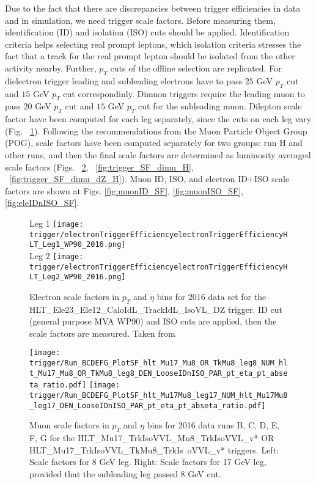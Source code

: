 Due to the fact that there are discrepancies between trigger efficiencies in data and in simulation, we need trigger scale factors. Before measuring them, identification (ID) and isolation (ISO) cuts should be applied. Identification criteria helps selecting real prompt leptons, which isolation criteria stresses the fact that a track for the real prompt lepton should be isolated from the other activity nearby. Further, $p_{T}$ cuts of the offline selection are replicated. For dielectron trigger leading and subleading electrons have to pass $25$ GeV $p_{T}$ cut and $15$ GeV $p_{T}$ cut correspondinly. Dimuon triggers require the leading muon to pass $20$ GeV $p_{T}$ cut and $15$ GeV $p_{T}$ cut for the subleading muon. 
Dilepton scale factor have been computed for each leg separately, since the cuts on each leg vary (Fig. ~\ref{fig:trigger_eff_diele}). Following the recommendations from the Muon Particle Object Group (POG), scale factors have been computed separately for two groups: run H and other runs, and then the final scale factors are determined as luminosity averaged scale factors (Figs. ~\ref{fig:trigger_SF_dimu_BCDEFG}, ~\ref{fig:trigger_SF_dimu_H}, ~\ref{fig:trigger_SF_dimu_dZ_H}). Muon ID, ISO, and electron ID$+$ISO scale factors are shown at Figs. \ref{fig:muonID_SF}, \ref{fig:muonISO_SF}, \ref{fig:eleIDnISO_SF}.


\begin{figure}
\centering
\subfloat Leg 1
{\texttt{[image: trigger/electronTriggerEfficiencyelectronTriggerEfficiencyHLT\_Leg1\_WP90\_2016.png]} } \\
\subfloat Leg 2
{\texttt{[image: trigger/electronTriggerEfficiencyelectronTriggerEfficiencyHLT\_Leg2\_WP90\_2016.png]} } \\
\caption{Electron scale factors in $p_{T}$ and $\eta$ bins for 2016 data set for the HLT\_Ele23\_Ele12\_CaloIdL\_TrackIdL\_IsoVL\_DZ trigger. ID cut (general purpose MVA WP90) and ISO cuts are applied, then the scale factors are measured. Taken from ~\cite{vhbbAN}}
\label{fig:trigger_eff_diele}
\end{figure}


\begin{figure}
\centering
\texttt{[image: trigger/Run\_BCDEFG\_PlotSF\_hlt\_Mu17\_Mu8\_OR\_TkMu8\_leg8\_NUM\_hlt\_Mu17\_Mu8\_OR\_TkMu8\_leg8\_DEN\_LooseIDnISO\_PAR\_pt\_eta\_pt\_abseta\_ratio.pdf]}
\texttt{[image: trigger/Run\_BCDEFG\_PlotSF\_hlt\_Mu17Mu8\_leg17\_NUM\_hlt\_Mu17Mu8\_leg17\_DEN\_LooseIDnISO\_PAR\_pt\_eta\_pt\_abseta\_ratio.pdf]}\\
\caption{Muon scale factors in $p_{T}$ and $\eta$ bins for 2016 data runs B, C, D, E, F, G for the  HLT\_Mu17\_TrkIsoVVL\_Mu8\_TrkIsoVVL\_v* OR HLT\_Mu17\_TrkIsoVVL\_TkMu8\_TrkIs\
oVVL\_v* triggers. Left: Scale factors for 8 GeV leg. Right: Scale factors for 17 GeV leg, provided that the subleading leg passed 8 GeV cut.}
\label{fig:trigger_SF_dimu_BCDEFG}
\end{figure}

